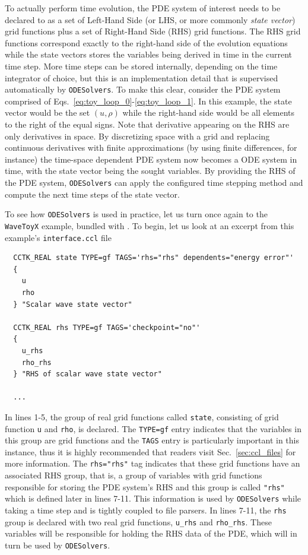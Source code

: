 To actually perform time evolution, the PDE system of interest needs to be declared to \Cactus\space as a set of Left-Hand Side (or LHS, or more commonly \textit{state vector}) grid functions plus a set of Right-Hand Side (RHS) grid functions. The RHS grid functions correspond exactly to the right-hand side of the evolution equations while the state vectors stores the variables being derived in time in the current time step. More time steps can be stored internally, depending on the time integrator of choice, but this is an implementation detail that is supervised automatically by \texttt{ODESolvers}. To make this clear, consider the PDE system comprised of Eqs.~\eqref{eq:toy_loop_0}-\eqref{eq:toy_loop_1}. In this example, the state vector would be the set $(u,\rho)$ while the right-hand side would be all elements to the right of the equal signs. Note that derivative appearing on the RHS are only derivatives in space. By discretizing space with a grid and replacing continuous derivatives with finite approximations (by using finite differences, for instance) the time-space dependent PDE system now becomes a ODE system in time, with the state vector being the sought variables. By providing the RHS of the PDE system, \texttt{ODESolvers} can apply the configured time stepping method and compute the next time steps of the state vector.

To see how \texttt{ODESolvers} is used in practice, let us turn once again to the \texttt{WaveToyX} example, bundled with \CarpetX. To begin, let us look at an excerpt from this example's \texttt{interface.ccl} file

\begin{verbatim}
  CCTK_REAL state TYPE=gf TAGS='rhs="rhs" dependents="energy error"'
  {
    u
    rho
  } "Scalar wave state vector"

  CCTK_REAL rhs TYPE=gf TAGS='checkpoint="no"'
  {
    u_rhs
    rho_rhs
  } "RHS of scalar wave state vector"

  ...
\end{verbatim}

In lines 1-5, the group of real grid functions called \texttt{state}, consisting of grid function \texttt{u} and \texttt{rho}, is declared. The \texttt{TYPE=gf} entry indicates that the variables in this group are grid functions and the \texttt{TAGS} entry is particularly important in this instance, thus it is highly recommended that readers visit Sec.~\ref{sec:ccl_files} for more information. The \texttt{rhs="rhs"} tag indicates that these grid functions have an associated RHS group, that is, a group of variables with grid functions responsible for storing the PDE system's RHS and this group is called \texttt{"rhs"} which is defined later in lines 7-11. This information is used by \texttt{ODESolvers} while taking a time step and is tightly coupled to \Cactus\space file parsers. In lines 7-11, the \texttt{rhs} group is declared with two real grid functions, \texttt{u\_rhs} and \texttt{rho\_rhs}. These variables will be responsible for holding the RHS data of the PDE, which will in turn be used by \texttt{ODESolvers}.


